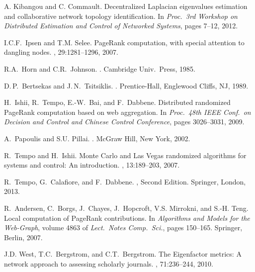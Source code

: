 \documentclass[11pt,draftcls,onecolumn]{IEEEtran}
\begin{document}
\begin{thebibliography}{1}
A. Kibangou and C. Commault.
\newblock Decentralized Laplacian eigenvalues estimation and collaborative 
network topology identification.
\newblock In {\em Proc.\ {\rm 3}rd Workshop on Distributed Estimation and 
Control of Networked Systems}, pages 7--12, 2012.

I.{\;}C.{\;}F.~Ipsen and T.{\;}M. Selee.
\newblock PageRank computation, with special attention to dangling nodes.
, 29:1281--1296, 2007.


R.{\;}A.\ Horn and C.{\;}R.\ Johnson.
.
\newblock Cambridge Univ.\ Press, 1985.

D.{\,}P.\ Bertsekas and J.{\,}N.\ Tsitsiklis.
.
\newblock Prentice-Hall, Englewood Cliffs, NJ, 1989.


H.~Ishii, R.~Tempo, E.-W.\ Bai, and F.~Dabbene.
\newblock Distributed randomized {P}age{R}ank computation based on web
  aggregation.
\newblock In {\em Proc.\ {\rm 48}th IEEE Conf.\ on Decision and Control and
  Chinese Control Conference}, pages 3026--3031, 2009.

A.~Papoulis and S.{\;}U. Pillai.
.
\newblock McGraw Hill, New York, 2002.

R.~Tempo and H.~Ishii.
\newblock Monte {C}arlo and {L}as {V}egas randomized algorithms for systems and
  control: {A}n introduction.
, 13:189--203, 2007.

R.~Tempo, G.~Calafiore, and F.~Dabbene.
, 
Second Edition.
\newblock Springer, London, 2013.

R.~Andersen, C.~Borgs, J.~Chayes, J.~Hopcroft, V.{\;}S. Mirrokni, and S.-H.
  Teng.
\newblock Local computation of {P}age{R}ank contributions.
\newblock In {\em Algorithms and Models for the Web-Graph}, volume 4863 of {\em
  Lect.\ Notes Comp.\ Sci.}, pages 150--165. Springer, Berlin, 2007.

J.{\;}D. West, T.{\;}C.~Bergstrom, and C.{\;}T.~Bergstrom.
\newblock The {E}igenfactor metrics:  {A} network approach to assessing scholarly journals.
, 71:236--244, 2010.


\end{thebibliography}
\end{document}
